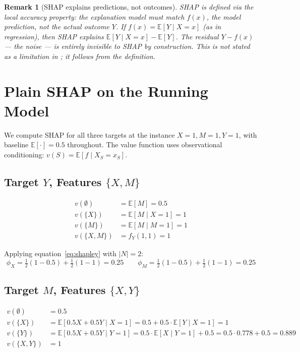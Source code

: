 \documentclass[12pt]{article}
\newtheorem{remark}{Remark}
\begin{document}
\begin{remark}[SHAP explains predictions, not outcomes]
SHAP is defined via the \emph{local accuracy} property: the explanation model must match
$f(x)$, the model prediction, not the actual outcome $Y$. If $f(x) = \mathbb{E}[Y \mid X=x]$
(as in regression), then SHAP explains $\mathbb{E}[Y \mid X=x] - \mathbb{E}[Y]$. The
residual $Y - f(x)$ --- the noise --- is entirely invisible to SHAP by construction. This
is not stated as a limitation in \citet{lundberg2017unified}; it follows from the definition.
\end{remark}

\section{Plain SHAP on the Running Model}

We compute SHAP for all three targets at the instance $X=1, M=1, Y=1$, with baseline
$\mathbb{E}[\cdot] = 0.5$ throughout. The value function uses observational conditioning:
$v(S) = \mathbb{E}[f \mid X_S = x_S]$.

\subsection{Target $Y$, Features $\{X, M\}$}

\begin{align}
v(\emptyset) &= \mathbb{E}[M] = 0.5 \\
v(\{X\}) &= \mathbb{E}[M \mid X=1] = 1 \\
v(\{M\}) &= \mathbb{E}[M \mid M=1] = 1 \\
v(\{X,M\}) &= f_Y(1,1) = 1
\end{align}

Applying equation~\eqref{eq:shapley} with $|N|=2$:
\begin{equation}
\phi_X = \tfrac{1}{2}(1 - 0.5) + \tfrac{1}{2}(1 - 1) = 0.25
\qquad
\phi_M = \tfrac{1}{2}(1 - 0.5) + \tfrac{1}{2}(1 - 1) = 0.25
\end{equation}

\subsection{Target $M$, Features $\{X, Y\}$}

\begin{align}
v(\emptyset) &= 0.5 \\
v(\{X\}) &= \mathbb{E}[0.5X + 0.5Y \mid X=1] = 0.5 + 0.5\cdot\mathbb{E}[Y\mid X=1] = 1 \\
v(\{Y\}) &= \mathbb{E}[0.5X + 0.5Y \mid Y=1] = 0.5\cdot\mathbb{E}[X\mid Y=1] + 0.5
         = 0.5\cdot 0.778 + 0.5 = 0.889 \\
v(\{X,Y\}) &= 1
\end{align}
\end{document}
